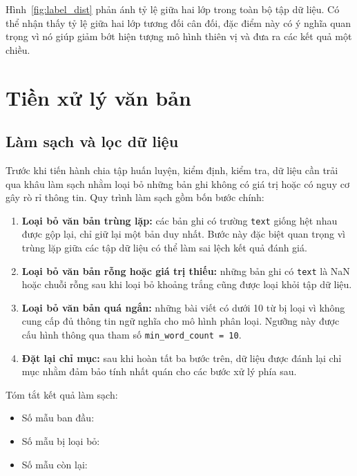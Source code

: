 \clearpage

Hình~\ref{fig:label_dist} phản ánh tỷ lệ giữa hai lớp trong toàn bộ tập dữ liệu. Có thể nhận thấy tỷ lệ giữa hai lớp tương đối cân đối, đặc điểm này có ý nghĩa quan trọng vì nó giúp giảm bớt hiện tượng mô hình thiên vị và đưa ra các kết quả một chiều. 

\section{Tiền xử lý văn bản}

\subsection{Làm sạch và lọc dữ liệu}

Trước khi tiến hành chia tập huấn luyện, kiểm định, kiểm tra, dữ liệu cần trải qua khâu làm sạch nhằm loại bỏ những bản ghi không có giá trị hoặc có nguy cơ gây rò rỉ thông tin. Quy trình làm sạch gồm bốn bước chính:

\begin{enumerate}[leftmargin=2.5em]
  \item \textbf{Loại bỏ văn bản trùng lặp:} các bản ghi có trường \texttt{text} giống hệt nhau được gộp lại, chỉ giữ lại một bản duy nhất. Bước này đặc biệt quan trọng vì trùng lặp giữa các tập dữ liệu có thể làm sai lệch kết quả đánh giá.

  \item \textbf{Loại bỏ văn bản rỗng hoặc giá trị thiếu:} những bản ghi có \texttt{text} là NaN hoặc chuỗi rỗng sau khi loại bỏ khoảng trắng cũng được loại khỏi tập dữ liệu.

  \item \textbf{Loại bỏ văn bản quá ngắn:} những bài viết có dưới 10 từ bị loại vì không cung cấp đủ thông tin ngữ nghĩa cho mô hình phân loại. Ngưỡng này được cấu hình thông qua tham số \texttt{min\_word\_count = 10}.

  \item \textbf{Đặt lại chỉ mục:} sau khi hoàn tất ba bước trên, dữ liệu được đánh lại chỉ mục nhằm đảm bảo tính nhất quán cho các bước xử lý phía sau.
\end{enumerate}

Tóm tắt kết quả làm sạch:

\begin{itemize}[leftmargin=2em]
  \item Số mẫu ban đầu: \nraw
  \item Số mẫu bị loại bỏ: \nremoved
  \item Số mẫu còn lại: \nclean
\end{itemize}

